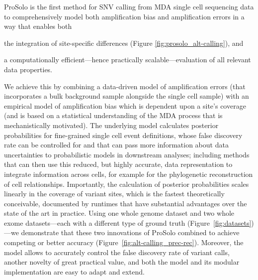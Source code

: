 \documentclass[12pt,inline]{wlscirep}
\begin{document}
ProSolo is the first method for SNV calling from MDA single cell sequencing data to comprehensively model both amplification bias and amplification errors in a way that enables both
\begin{enumerate*}
 \item the integration of site-specific differences (Figure \ref{fig:prosolo_alt-calling}), and
 \item a computationally efficient---hence practically scalable---evaluation of all relevant data properties.
\end{enumerate*}
We achieve this by combining a data-driven model of amplification errors (that incorporates a bulk background sample alongside the single cell sample) with an empirical model of amplification bias which is dependent upon a site's coverage (and is based on a statistical understanding of the MDA process that is mechanistically motivated).
The underlying model calculates posterior probabilities for fine-grained single cell event definitions, whose false discovery rate can be controlled for and that can pass more information about data uncertainties to probabilistic models in downstream analyses; including methods that can then use this reduced, but highly accurate, data representation to integrate information across cells, for example for the phylogenetic reconstruction of cell relationships.
Importantly, the calculation of posterior probabilities scales linearly in the coverage of variant sites, which is the fastest theoretically conceivable, documented by runtimes that have substantial advantages over the state of the art in practice.
Using one whole genome dataset and two whole exome datasets---each with a different type of ground truth (Figure~\ref{fig:datasets})---we demonstrate that these two innovations of ProSolo combined to achieve competing or better accuracy (Figure~\ref{fig:alt-calling_prec-rec}).
Moreover, the model allows to accurately control the false discovery rate of variant calls, another novelty of great practical value, and both the model and its modular implementation are easy to adapt and extend.
\end{document}

